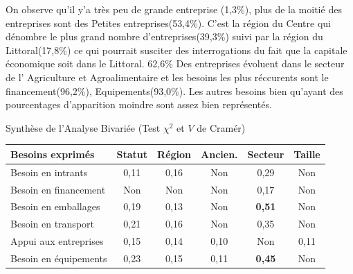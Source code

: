\documentclass[aspectratio=169, 10pt]{beamer}
\begin{document}
	On observe qu'il y'a très peu de grande entreprise (1,3\%), plus de la moitié des entreprises sont des Petites entreprises(53,4\%). C'est la région du Centre qui dénombre le plus grand nombre d'entreprises(39,3\%) suivi par la région du Littoral(17,8\%) ce qui pourrait susciter des interrogations du fait que la capitale économique soit dans le Littoral. 62,6\% Des entreprises évoluent dans le secteur de l' Agriculture et Agroalimentaire et les besoins les plus réccurents sont le financement(96,2\%), Equipements(93,0\%). Les autres besoins bien qu'ayant des pourcentages d'apparition moindre sont assez bien représentés. 


\begin{frame}{Synthèse de l'Analyse Bivariée (Test $\chi^2$ et $V$ de Cramér)}
	\begin{center}
		\scriptsize %
		\renewcommand{\arraystretch}{1.2}
		\begin{tabular}{l|ccccc}
			\toprule
			\textbf{Besoins exprimés} & \textbf{Statut} & \textbf{Région} & \textbf{Ancien.} & \textbf{Secteur} & \textbf{Taille} \\
			\midrule
			Besoin en intrants & \cellcolor{green!15}0,11 & \cellcolor{green!15}0,16 & Non & \cellcolor{green!15}0,29 & Non \\
			
			\rowcolor{gray!5}
			Besoin en financement & Non & Non & Non & \cellcolor{green!15}0,17 & Non \\
			
			Besoin en emballages & \cellcolor{green!15}0,19 & \cellcolor{green!15}0,13 & Non & \cellcolor{blue!15}\textbf{0,51} & Non \\
			
			\rowcolor{gray!5}
			Besoin en transport & \cellcolor{green!15}0,21 & \cellcolor{green!15}0,16 & Non & \cellcolor{green!15}0,35 & Non \\
			
			Appui aux entreprises & \cellcolor{green!15}0,15 & \cellcolor{green!15}0,14 & \cellcolor{green!10}0,10 & Non & \cellcolor{green!10}0,11 \\
			
			\rowcolor{gray!5}
			Besoin en équipements & \cellcolor{green!15}0,23 & \cellcolor{green!15}0,15 & \cellcolor{green!10}0,11 & \cellcolor{blue!15}\textbf{0,45} & Non \\
			

\end{tabular}
\end{center}
\end{frame}
\end{document}
